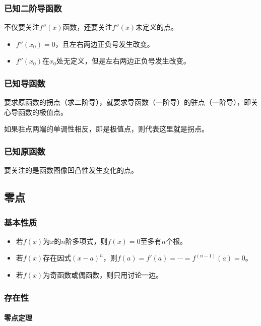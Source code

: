 \documentclass[UTF8, 12pt]{ctexart}
\begin{document}
\subsubsection{已知二阶导函数}

不仅要关注$f''(x)$函数，还要关注$f''(x)$未定义的点。

\begin{itemize}
    \item $f''(x_0)=0$，且左右两边正负号发生改变。
    \item $f''(x_0)$在$x_0$处无定义，但是左右两边正负号发生改变。
\end{itemize}

\subsubsection{已知导函数}

要求原函数的拐点（求二阶导），就要求导函数（一阶导）的驻点（一阶导），即关心导函数的极值点。

如果驻点两端的单调性相反，即是极值点，则代表这里就是拐点。

\subsubsection{已知原函数}

要关注的是函数图像凹凸性发生变化的点。

\subsection{零点}

\subsubsection{基本性质}

\begin{itemize}
    \item 若$f(x)$为$x$的$n$阶多项式，则$f(x)=0$至多有$n$个根。
    \item 若$f(x)$存在因式$(x-a)^n$，则$f(a)=f'(a)=\cdots=f^{(n-1)}(a)=0$。
    \item 若$f(x)$为奇函数或偶函数，则只用讨论一边。
\end{itemize}

\subsubsection{存在性}

\paragraph{零点定理} \leavevmode \medskip
\end{document}
